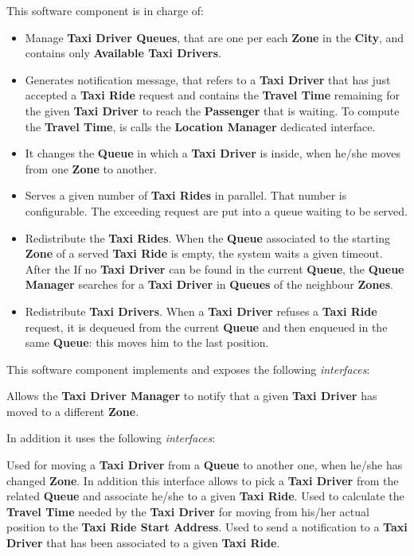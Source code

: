 \begin{itemize}
\begin{itemize}
		 This software component is in charge of:
		\begin{itemize}
			\item Manage \textbf{Taxi Driver Queues}, that are one per each \textbf{Zone} in the \textbf{City}, and contains only \textbf{Available Taxi Drivers}.
			\item Generates notification message, that refers to a \textbf{Taxi Driver} that has just accepted a \textbf{Taxi Ride} request and contains the \textbf{Travel Time} remaining for the given \textbf{Taxi Driver} to reach the \textbf{Passenger} that is waiting.
			To compute the \textbf{Travel Time}, is calls the \textbf{Location Manager} dedicated interface.
			\item It changes the \textbf{Queue} in which a \textbf{Taxi Driver} is inside, when he/she moves from one \textbf{Zone} to another.
			\item Serves a given number of \textbf{Taxi Rides} in parallel. That number is configurable. The exceeding request are put into a queue waiting to be served.
			\item Redistribute the \textbf{Taxi Rides}. When the \textbf{Queue} associated to the starting \textbf{Zone} of a served \textbf{Taxi Ride} is empty, the system waits a given timeout. After the If no \textbf{Taxi Driver} can be found in the current \textbf{Queue}, the \textbf{Queue Manager} searches for a \textbf{Taxi Driver} in \textbf{Queues} of the neighbour \textbf{Zones}.
			\item Redistribute \textbf{Taxi Drivers}. When a \textbf{Taxi Driver} refuses a \textbf{Taxi Ride} request, it is dequeued from the current \textbf{Queue} and then enqueued in the same \textbf{Queue}: this moves him to the last position.
		\end{itemize}
		This software component implements and exposes the following \textit{interfaces}:
		\begin{itemize}
			 Allows the \textbf{Taxi Driver Manager} to notify that a given \textbf{Taxi Driver} has moved to a different \textbf{Zone}.
		\end{itemize}
		In addition it uses the following \textit{interfaces}:
		\begin{itemize}
			 Used for moving a \textbf{Taxi Driver} from a \textbf{Queue} to another one, when he/she has changed \textbf{Zone}.
			In addition this interface allows to pick a \textbf{Taxi Driver} from the related \textbf{Queue} and associate he/she to a given \textbf{Taxi Ride}.
			 Used to calculate the \textbf{Travel Time} needed by the \textbf{Taxi Driver} for moving from his/her actual position to the \textbf{Taxi Ride Start Address}.
				Used to send a notification to a \textbf{Taxi Driver} that has been associated to a given \textbf{Taxi Ride}.
		\end{itemize}
		

\end{itemize}
\end{itemize}
